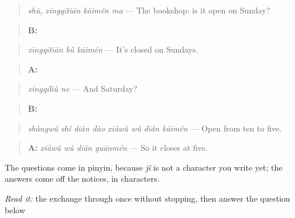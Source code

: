 \begin{quote}
\emph{shū, xīngqītiān kāimén ma} — The bookshop: is it open on Sunday?
\end{quote}

\begin{quote}
\textbf{B:} 
\end{quote}

\begin{quote}
\emph{xīngqītiān bù kāimén} — It's closed on Sundays.
\end{quote}

\begin{quote}
\textbf{A:} 
\end{quote}

\begin{quote}
\emph{xīngqīliù ne} — And Saturday?
\end{quote}

\begin{quote}
\textbf{B:} 
\end{quote}

\begin{quote}
\emph{shàngwǔ shí diǎn dào xiàwǔ wǔ diǎn kāimén} — Open from ten to five.
\end{quote}

\begin{quote}
\textbf{A:} \emph{xiàwǔ wǔ diǎn guānmén} — So it closes at five.
\end{quote}

The questions come in pinyin, because \emph{jǐ} is not a character you write yet; the answers come off the notices, in characters.

\begin{tcolorbox}[breakable,skin=enhanced,colback=orange!6,colframe=orange!45!black,boxrule=0.5pt,arc=1mm,left=6pt,right=6pt,top=4pt,bottom=4pt,fonttitle=\bfseries,title={Read this}]
\emph{Read it:} the exchange through once without stopping, then answer the question below
\end{tcolorbox}

